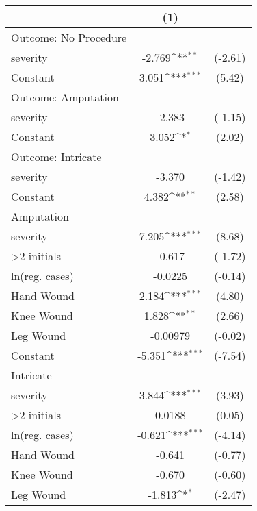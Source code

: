 {
\def\sym#1{\ifmmode^{#1}\else\(^{#1}\)\fi}
\begin{tabular}{l*{1}{cc}}
\hline\hline
                    &\multicolumn{1}{c}{(1)}         &            \\
\hline
Outcome: No Procedure&                     &            \\
severity            &      -2.769\sym{**} &     (-2.61)\\
Constant            &       3.051\sym{***}&      (5.42)\\
\hline
Outcome: Amputation &                     &            \\
severity            &      -2.383         &     (-1.15)\\
Constant            &       3.052\sym{*}  &      (2.02)\\
\hline
Outcome: Intricate  &                     &            \\
severity            &      -3.370         &     (-1.42)\\
Constant            &       4.382\sym{**} &      (2.58)\\
\hline
Amputation          &                     &            \\
severity            &       7.205\sym{***}&      (8.68)\\
>2 initials         &      -0.617         &     (-1.72)\\
ln(reg. cases)      &     -0.0225         &     (-0.14)\\
Hand Wound          &       2.184\sym{***}&      (4.80)\\
Knee Wound          &       1.828\sym{**} &      (2.66)\\
Leg Wound           &    -0.00979         &     (-0.02)\\
Constant            &      -5.351\sym{***}&     (-7.54)\\
\hline
Intricate           &                     &            \\
severity            &       3.844\sym{***}&      (3.93)\\
>2 initials         &      0.0188         &      (0.05)\\
ln(reg. cases)      &      -0.621\sym{***}&     (-4.14)\\
Hand Wound          &      -0.641         &     (-0.77)\\
Knee Wound          &      -0.670         &     (-0.60)\\
Leg Wound           &      -1.813\sym{*}  &     (-2.47)\\

\end{tabular}}

